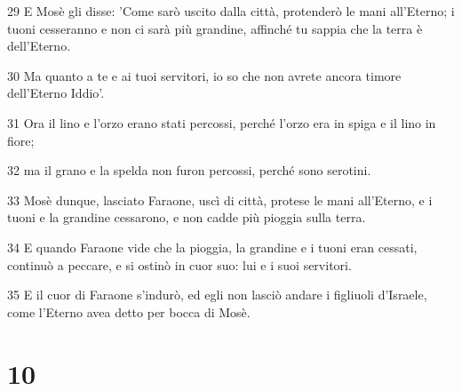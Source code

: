 \par 29 E Mosè gli disse: 'Come sarò uscito dalla città, protenderò le mani all'Eterno; i tuoni cesseranno e non ci sarà più grandine, affinché tu sappia che la terra è dell'Eterno.
\par 30 Ma quanto a te e ai tuoi servitori, io so che non avrete ancora timore dell'Eterno Iddio'.
\par 31 Ora il lino e l'orzo erano stati percossi, perché l'orzo era in spiga e il lino in fiore;
\par 32 ma il grano e la spelda non furon percossi, perché sono serotini.
\par 33 Mosè dunque, lasciato Faraone, uscì di città, protese le mani all'Eterno, e i tuoni e la grandine cessarono, e non cadde più pioggia sulla terra.
\par 34 E quando Faraone vide che la pioggia, la grandine e i tuoni eran cessati, continuò a peccare, e si ostinò in cuor suo: lui e i suoi servitori.
\par 35 E il cuor di Faraone s'indurò, ed egli non lasciò andare i figliuoli d'Israele, come l'Eterno avea detto per bocca di Mosè.

\chapter{10}

